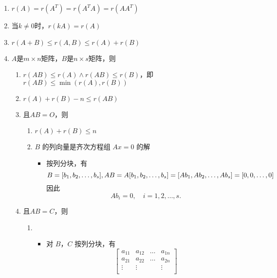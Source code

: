 \documentclass[a4paper,12pt]{article}
\begin{document}
    \begin{enumerate}
        \item $r(A) = r(A^T) = r(A^{T}A) = r(AA^{T})$
        \item 当$k \neq 0$时，$r(kA) = r(A)$
        \item $r(A + B) \le r(A, B) \le r(A) + r(B)$
        \item $A$是$m \times n$矩阵，$B$是$n \times s$矩阵，则
        \begin{enumerate}
            \item $r(AB) \le r(A) \land r(AB) \le r(B)$，即 $r(AB) \le \min(r(A), r(B))$
            \item $r(A) + r(B) - n \le r(AB)$
            \item 且$AB = O$，则
            \begin{enumerate}
                \item $r(A) + r(B) \le n$
                \item $B$ 的列向量是齐次方程组 $Ax = 0$ 的解
                \begin{itemize}
                    \item 按列分块，有
                    \[
                        B = [b_1, b_2, \dots, b_s], \\
                        AB = A[b_1, b_2, \dots, b_s] = [Ab_1, Ab_2, \dots, Ab_s] = [0, 0, \dots, 0]
                    \]
                    因此
                    \[
                        Ab_i = 0, \quad i = 1, 2, \dots, s.
                    \]
                \end{itemize}
            \end{enumerate}
            \item 且$AB = C$，则
            \begin{enumerate}
                \item {\color[rgb]{0.2, 0.6, 0.3}{矩阵$AB$的行向量$\alpha_1, \alpha_2, \dots, \alpha_n$可由$B$的行向量$\beta_1, \beta_2, \dots, \beta_n$线性表出}}
                \begin{itemize}
                    \item 对 $B$，$C$ 按列分块，有
                    \[
                        \begin{bmatrix}
                            a_{11} & a_{12} & \dots & a_{1n} \\
                            a_{21} & a_{22} & \dots & a_{2n} \\
                            \vdots & \vdots &       & \vdots \\

\end{bmatrix}\]
\end{itemize}
\end{enumerate}
\end{enumerate}
\end{enumerate}
\end{document}
